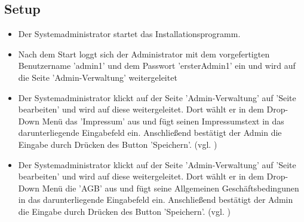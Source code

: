 \documentclass[a4paper]{scrreprt}
\begin{document}
		\subsection{Setup}
			\begin{itemize}
				\item {} 
			     Der Systemadministrator startet das Installationsprogramm. 
						
				\item Nach dem Start loggt sich der Administrator mit dem vorgefertigten Benutzername 'admin1' und dem Passwort    'ersterAdmin1' ein und wird auf die Seite 'Admin-Verwaltung' weitergeleitet 
				 
				\item {}
				 Der Systemadministrator klickt auf der Seite 'Admin-Verwaltung' auf 'Seite bearbeiten' und wird auf diese weitergeleitet. Dort wählt er in dem Drop-Down Menü das 'Impressum' aus und fügt seinen Impressumstext in das darunterliegende Eingabefeld ein. Anschließend bestätigt der Admin die Eingabe durch Drücken des Button 'Speichern'. (vgl. )
				 
				\item {}
				 Der Systemadministrator klickt auf der Seite 'Admin-Verwaltung' auf 'Seite bearbeiten' und wird auf diese weitergeleitet. Dort wählt er in dem Drop-Down Menü die 'AGB' aus und fügt seine Allgemeinen Geschäftsbedingunen in das darunterliegende Eingabefeld ein. Anschließend bestätigt der Admin die Eingabe durch Drücken des Button 'Speichern'. (vgl. )
			\end{itemize}		
				
\end{document}

